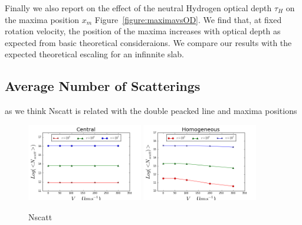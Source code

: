 \documentclass[usenatbib]{mn2e}
\newcommand{\kms}{\,km~s$^{-1}$}
\begin{document}





Finally we also report on the effect of the neutral Hydrogen
optical depth $\tau_{H}$ on the maxima position $x_{m}$
Figure~\ref{figure:maximavsOD}. We find that, at fixed
rotation velocity, the position of the maxima increases with optical
depth as expected from basic theoretical consideraions. We compare
our results with the expected theoretical escaling for an infinnite
slab. 




\subsection{Average Number of Scatterings}

as we think Nscatt is related with the double peacked line and maxima positions 


\begin{figure}[ht]
    \includegraphics[width=0.45\textwidth]{NscattCentral.png}
    \includegraphics[width=0.45\textwidth]{NscattHOM.png}
\caption{Nscatt\label{fig:Nscatt}} 
\end{figure}
\end{document}
